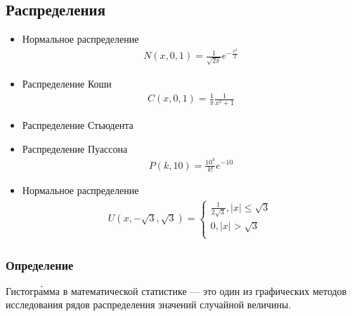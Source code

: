 \subsection{Распределения}
\begin{itemize}
    \item  Нормальное распределение \begin{gather*}
 N(x,0,1) = \frac{1}{\sqrt{2\pi}}e^{-\frac{x^{2}}{2}}
\end{gather*} 
    \item  Распределение Коши  
    \begin{gather*}
    C(x,0,1) = \frac{1}{\pi}\frac{1}{x^{2} + 1}
\end{gather*} 
    \item  Распределение Стьюдента 
    \item  Распределение Пуассона
    \begin{gather*}
 P(k,10) = \frac{10^{k}}{k!}e^{-10}
\end{gather*} 
    \item  Нормальное распределение
    \begin{gather*}
U(x,-\sqrt{3}, \sqrt{3}) = \begin{cases}
\frac{1}{2\sqrt{3}}, |x| \leq \sqrt{3}\\
0,  |x| > \sqrt{3} \\ 
\end{cases}
\end{gather*}

\end{itemize}


\subsubsection{Определение}
Гистогра́мма в математической статистике — это один из графических методов исследования рядов распределения значений случайной величины.

